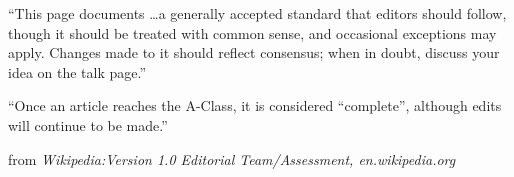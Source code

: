 \clearpage

\narrowlinespacing

\vspace*{4mm}

``This page documents \ldots a generally accepted standard that
editors should follow, though it should be treated with common sense,
and occasional exceptions may apply. Changes made to it should reflect
consensus; when in doubt, discuss your idea on the talk page.''

``Once an article reaches the A-Class, it is considered ``complete'',
although edits will continue to be made.''

from \emph{Wikipedia:Version 1.0 Editorial Team/Assessment, en.wikipedia.org}
\normallinespacing
